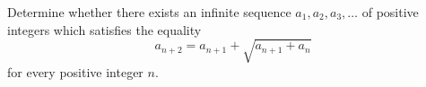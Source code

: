 Determine whether there exists an infinite sequence $a_1, a_2, a_3, \dots$ of positive integers
which satisfies the equality \[a_{n+2}=a_{n+1}+\sqrt{a_{n+1}+a_{n}} \] for every positive integer $n$.